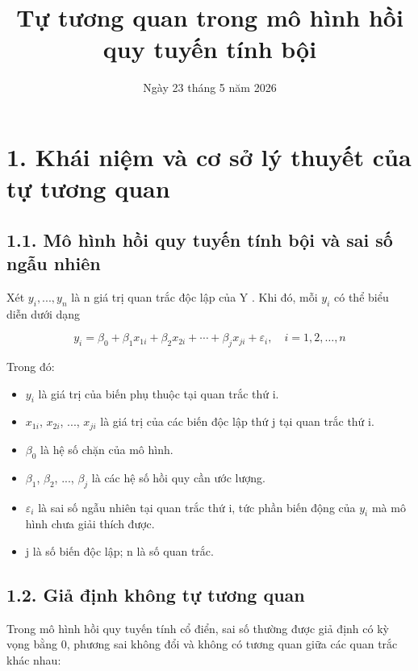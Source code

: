 \documentclass[12pt,a4paper]{article}
\title{\textbf{Tự tương quan trong mô hình hồi quy tuyến tính bội}}
\author{}
\date{Ngày 23 tháng 5 năm 2026}
\begin{document}
\maketitle

{
\setcounter{tocdepth}{3}
\tableofcontents
}
\section{1. Khái niệm và cơ sở lý thuyết của tự tương
quan}\label{khuxe1i-niux1ec7m-vuxe0-cux1a1-sux1edf-luxfd-thuyux1ebft-cux1ee7a-tux1ef1-tux1b0ux1a1ng-quan}

\subsection{1.1. Mô hình hồi quy tuyến tính bội và sai số ngẫu
nhiên}\label{nhux1eafc-lux1ea1i-muxf4-huxecnh-hux1ed3i-quy-tuyux1ebfn-tuxednh-bux1ed9i-vuxe0-sai-sux1ed1-ngux1eabu-nhiuxean}

Xét \(y_i , . . . , y_n\) là n giá trị quan trắc độc lập của Y . Khi đó, mỗi \(y_i\) có
thể biểu diễn dưới dạng

\[
y_i = \beta_0 + \beta_1x_{1i} + \beta_2x_{2i} + \cdots + \beta_jx_{ji} + \varepsilon_i,\quad i = 1,2,\ldots,n
\]

Trong đó:

\begin{itemize}
\item
  \(y_i\) là giá trị của biến phụ thuộc tại quan trắc thứ i.
\item
  \(x_{1i}\), \(x_{2i}\), ..., \(x_{ji}\) là giá trị của các biến độc lập thứ j tại quan trắc thứ
  i.
\item
  \(\beta_0\) là hệ số chặn của mô hình.
\item
  \(\beta_1\), \(\beta_2\), ..., \(\beta_j\) là các hệ số hồi quy cần ước lượng.
\item
  \(\varepsilon_i\) là sai số ngẫu nhiên tại quan trắc thứ i, tức phần biến động của \(y_i\)
  mà mô hình chưa giải thích được.
\item
  j là số biến độc lập; n là số quan trắc.
\end{itemize}

\subsection{1.2. Giả định không tự tương
quan}\label{giux1ea3-ux111ux1ecbnh-khuxf4ng-tux1ef1-tux1b0ux1a1ng-quan}

Trong mô hình hồi quy tuyến tính cổ điển, sai số thường được giả định có
kỳ vọng bằng 0, phương sai không đổi và không có tương quan giữa các
quan trắc khác nhau:
\end{document}

